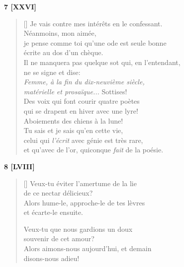 \documentclass[a4paper,12pt]{book}
\begin{document}
\bigskip

\begin{center}
  \textbf{7 [XXVI]}
\end{center}

\settowidth{\versewidth}{je pense comme toi qu'une ode est seule bonne}

\begin{verse}[\versewidth]
  Je vais contre mes intérêts en le confessant. \\
  Néanmoins, mon aimée, \\
  je pense comme toi qu'une ode est seule bonne \\
  écrite au dos d'un chèque. \\
  Il ne manquera pas quelque sot qui, en l'entendant, \\
  ne se signe et dise: \\
  \emph{Femme, à la fin du dix-neuvième siècle, \\
    matérielle et prosaïque...} Sottises! \\
  Des voix qui font courir quatre poètes \\
  qui se drapent en hiver avec une lyre! \\
  Aboiements des chiens à la lune! \\
  Tu sais et je sais qu'en cette vie, \\
  celui qui \emph{l'écrit} avec génie est très rare, \\
  et qu'avec de l'or, quiconque \emph{fait} de la poésie.
\end{verse}

\bigskip

\begin{center}
  \textbf{8 [LVIII]}
\end{center}

\settowidth{\versewidth}{Alors hume-le, approche-le de tes lèvres}

\begin{verse}[\versewidth]
  Veux-tu éviter l'amertume de la lie \\
  de ce nectar délicieux? \\
  Alors hume-le, approche-le de tes lèvres \\
  et écarte-le ensuite.

  Veux-tu que nous gardions un doux \\
  souvenir de cet amour? \\
  Alors aimons-nous aujourd'hui, et demain \\
  disons-nous adieu!
\end{verse}
\end{document}
